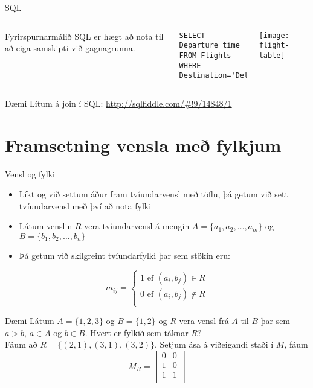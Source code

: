 \documentclass{beamer}
\begin{document}
\begin{frame}[fragile]{SQL}
\begin{columns}
Fyrirspurnarmálið SQL er hægt að nota til að eiga samskipti við gagnagrunna.
\vspace{0.5cm}
\begin{verbatim}
SELECT Departure_time
FROM Flights
WHERE Destination='Detroit';
\end{verbatim}

\begin{center}
\texttt{[image: flight-table]}
\vspace{1cm}
\end{center}
\end{columns}
\end{frame}

\begin{frame}{Dæmi}
Lítum á join í SQL: \url{http://sqlfiddle.com/\#!9/14848/1}
\end{frame}

\section{Framsetning vensla með fylkjum}

\begin{frame}{Vensl og fylki}
\begin{itemize}
 \item Líkt og við settum áður fram tvíundarvensl með töflu, þá getum við sett tvíundarvensl með því að nota fylki
 \item Látum venslin $R$ vera tvíundarvensl á mengin $A = \{a_1, a_2, \ldots, a_m \}$ og $B = \{b_1, b_2, \ldots, b_n\}$
 \item Þá getum við skilgreint tvíundarfylki þar sem stökin eru:
\end{itemize}
\[
 m_{ij} = \left\{
\begin{matrix}
1 \text{ ef } (a_i, b_j) \in R\\
0 \text{ ef } (a_i, b_j) \notin R\\
\end{matrix}\right.
\]
\end{frame}

\begin{frame}{Dæmi}
Látum $A= \{1, 2, 3\}$ og $B = \{1, 2\}$ og $R$ vera vensl frá $A$ til $B$ þar sem $a > b$, $a \in A$ og $b \in B$. Hvert er fylkið sem táknar $R$?\\
\pause
Fáum að $R= \{(2, 1), (3, 1), (3, 2)\}$. Setjum ása á viðeigandi staði í $M$, fáum 
\[
 M_R =
\begin{bmatrix}
0 & 0\\
1 & 0\\
1 & 1\\
\end{bmatrix}
\]
\end{frame}
\end{document}
